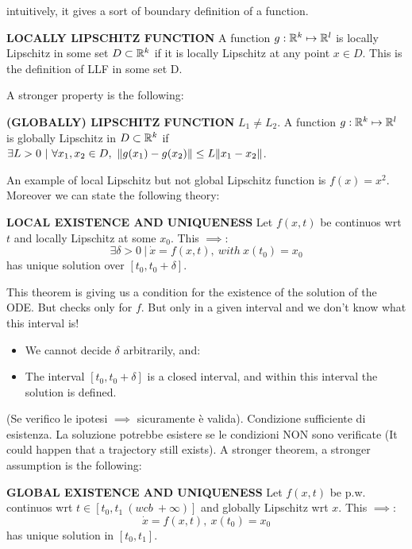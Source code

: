 intuitively, it gives a sort of boundary definition of a function.

\begin{defn}{\textbf{LOCALLY LIPSCHITZ FUNCTION}}
	A function $g: \mathbb{R}^k \mapsto \mathbb{R}^l$ is locally Lipschitz in some set $D \subset \mathbb{R}^k$ if it is locally Lipschitz at any point $x \in D$. This is the definition of LLF in some set D.
\end{defn}

A stronger property is the following:

\begin{defn}{\textbf{(GLOBALLY) LIPSCHITZ FUNCTION}}
$L_1 \neq L_2$. A function $g: \mathbb{R}^k \mapsto \mathbb{R}^l$ is globally Lipschitz in $D \subset \mathbb{R}^k$ if $\exists L > 0\ |\ \forall x_1,x_2 \in D,\ \lVert g(x_1) - g(x_2)\rVert \leq L\lVert x_1 - x_2\rVert$.
\end{defn}

An example of local Lipschitz but not global Lipschitz function is $f(x) = x^2$.
Moreover we can state the following theory:

\begin{defn}{\textbf{LOCAL EXISTENCE AND UNIQUENESS}}
Let $f(x,t)$ be continuos wrt $t$ and locally Lipschitz at some $x_0$. This $\implies:$
\[
	\exists \delta > 0\ |\ \dot{x} = f(x,t),\ with\ x(t_0) = x_0
\]
has unique solution over $[t_0, t_0 + \delta]$.
\end{defn}

This theorem is giving us a condition for the existence of the solution of the ODE. But checks only for $f$. But only in a given interval and we don't know what this interval is!

\begin{itemize}
\item We cannot decide $\delta$ arbitrarily, and:
\item The interval $[t_0, t_0 + \delta]$ is a closed interval, and within this interval the solution is defined.
\end{itemize}

(Se verifico le ipotesi $\implies$ sicuramente è valida). Condizione sufficiente di esistenza. La soluzione potrebbe esistere se le condizioni NON sono verificate (It could happen that a trajectory still exists). A stronger theorem, a stronger assumption is the following:

\begin{defn}{\textbf{GLOBAL EXISTENCE AND UNIQUENESS}}
Let $f(x,t)$ be p.w. continuos wrt $t \in [t_0, t_1\ (wcb\ +\infty)]$ and globally Lipschitz wrt $x$. This $\implies$:
\[
	\dot{x} = f(x,t),\ x(t_0) = x_0 
\]
has unique solution in $[t_0,t_1]$.
\end{defn}

